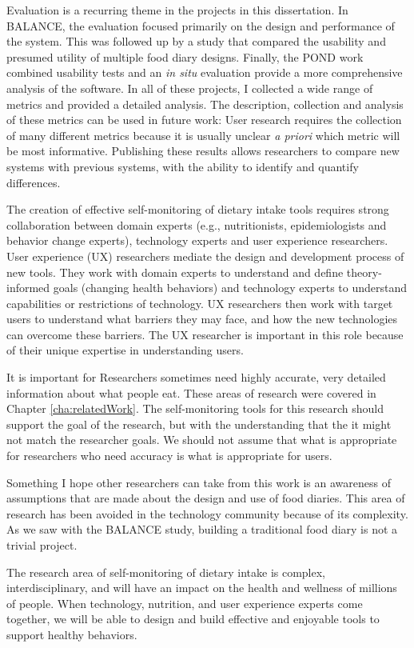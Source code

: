 Evaluation is a recurring theme in the projects in this dissertation. In BALANCE, the evaluation focused primarily on the design and performance of the system. This was followed up by a study that compared the usability and presumed utility of multiple food diary designs. Finally, the POND work combined usability tests and an \textit{in situ} evaluation provide a more comprehensive analysis of the software. In all of these projects, I collected a wide range of metrics and provided a detailed analysis. The description, collection and analysis of these metrics can be used in future work: User research requires the collection of many different metrics because it is usually unclear \textit{a priori} which metric will be most informative. Publishing these results allows researchers to compare new systems with previous systems, with the ability to identify and quantify differences. 

The creation of effective self-monitoring of dietary intake tools requires strong collaboration between domain experts (e.g., nutritionists, epidemiologists and behavior change experts), technology experts and user experience researchers. User experience (UX) researchers mediate the design and development process of new tools. They work with domain experts to understand and define theory-informed goals (changing health behaviors) and technology experts to understand capabilities or restrictions of technology. UX researchers then work with target users to understand what barriers they may face, and how the new technologies can overcome these barriers. The UX researcher is important in this role because of their unique expertise in understanding users. 


It is important for Researchers sometimes need highly accurate, very detailed information about what people eat. These areas of research were covered in Chapter \ref{cha:relatedWork}. The self-monitoring tools for this research should support the goal of the research, but with the understanding that the it might not match the researcher goals. We should not  assume that what is appropriate for researchers who need accuracy is what is appropriate for users. 

Something I hope other researchers can take from this work is an awareness of assumptions that are made about the design and use of food diaries. This area of research has been avoided in the technology community because of its complexity. As we saw with the BALANCE study, building a traditional food diary is not a trivial project. 



The research area of self-monitoring of dietary intake is complex, interdisciplinary, and will have an impact on the health and wellness of millions of people. When technology, nutrition, and user experience experts come together, we will be able to design and build effective and enjoyable tools to support healthy behaviors. 

